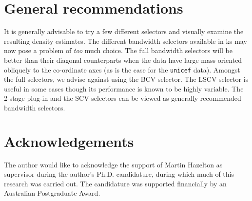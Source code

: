\documentclass[a4paper,11pt]{article}
\let\code=\texttt
\newcommand{\pkg}[1]{{\normalfont\fontseries{b}\selectfont #1}}
\begin{document}
\section{General recommendations}

It is generally advisable to try a few 
different selectors and visually examine the resulting density estimates. 
The different bandwidth selectors available in \pkg{ks} may
now pose a problem of \emph{too} much choice.
The full bandwidth selectors will be better than their diagonal counterparts
when the data have large mass oriented obliquely to the co-ordinate axes 
(as is the case for the \code{unicef} data). 
Amongst the full selectors, we advise against using the BCV selector. 
The LSCV selector is useful in some cases though its performance is 
known to be highly variable. The 2-stage plug-in and the SCV selectors
can be viewed as generally recommended bandwidth selectors.


\section{Acknowledgements}

The author would like to acknowledge the support of Martin Hazelton as
supervisor during the author's Ph.D. candidature, during which much of this
research was carried out. The candidature was supported financially by an Australian
Postgraduate Award. 




%
\end{document}
